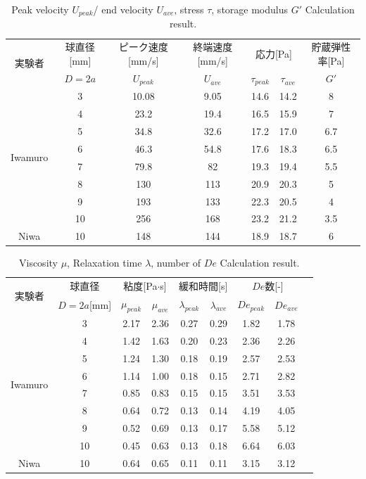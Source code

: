 \begin{table}[hbtp]
    \caption{Peak velocity $U_{peak}$/ end velocity $U_{ave}$, stress $\tau$, storage modulus $G'$ Calculation result.}
    \label{table:iwamuro}
    \centering
    \begin{tabular}{ccccccc}
      \hline
      \multirow{2}{*}{実験者} & 球直径[mm] & ピーク速度[mm/s] & 終端速度[mm/s] &\multicolumn{2}{c}{応力[Pa]} & 貯蔵弾性率[Pa] \\
       & $D=2a$ & $U_{peak}$ & $U_{ave}$ &  $\tau_{peak}$ & $\tau_{ave}$ & $G'$\\
      \hline \hline
      \multirow{8}{*}{Iwamuro} & 3  & 10.08 & 9.05 & 14.6 & 14.2 & 8\\
      & 4  & 23.2 & 19.4 & 16.5 & 15.9 & 7\\
      & 5  & 34.8 & 32.6 & 17.2 & 17.0 & 6.7 \\
      & 6  & 46.3 & 54.8 & 17.6 & 18.3 & 6.5\\
      & 7  & 79.8 & 82 & 19.3 & 19.4 & 5.5\\
      & 8  & 130 & 113 & 20.9 & 20.3 & 5 \\
      & 9  & 193 & 133 & 22.3 & 20.5 & 4\\
      & 10 & 256 & 168 & 23.2 & 21.2 & 3.5\\
      \hline \hline
      Niwa & 10 & 148 & 144 & 18.9 & 18.7 & 6 \\
      \hline
    \end{tabular}
\end{table}
\begin{table}[hbtp]
    \caption{Viscosity $\mu$, Relaxation time $\lambda$, number of $De$ Calculation result.}
    \label{table:iwamuro2}
    \centering
    \begin{tabular}{ccccccccc}
      \hline
      \multirow{2}{*}{実験者} & 球直径 &\multicolumn{2}{c}{粘度[Pa$\cdot$s]} &\multicolumn{2}{c}{緩和時間[s]}  &\multicolumn{2}{c}{$De$数[-]} \\
       & $D=2a$[mm] & $\mu_{peak}$ & $\mu_{ave}$  &  $\lambda_{peak}$ & $\lambda_{ave}$ & $De_{peak}$ & $De_{ave}$ \\
      \hline \hline
      \multirow{8}{*}{Iwamuro} & 3  & 2.17 & 2.36 & 0.27 & 0.29 & 1.82 & 1.78\\
      & 4  & 1.42 & 1.63 & 0.20 & 0.23 & 2.36 & 2.26\\
      & 5  & 1.24 & 1.30 & 0.18 & 0.19 & 2.57 & 2.53 \\
      & 6  & 1.14 & 1.00 & 0.18 & 0.15 & 2.71 & 2.82\\
      & 7  & 0.85 & 0.83 & 0.15 & 0.15 & 3.51 & 3.53\\
      & 8  & 0.64 & 0.72 & 0.13 & 0.14 & 4.19 & 4.05 \\
      & 9  & 0.52 & 0.69 & 0.13 & 0.17 & 5.58 & 5.12\\
      & 10 & 0.45 & 0.63 & 0.13 & 0.18 & 6.64 & 6.03\\
      \hline \hline
      Niwa & 10 & 0.64 & 0.65 & 0.11 & 0.11 & 3.15 & 3.12 \\
      \hline
    \end{tabular}
\end{table}
